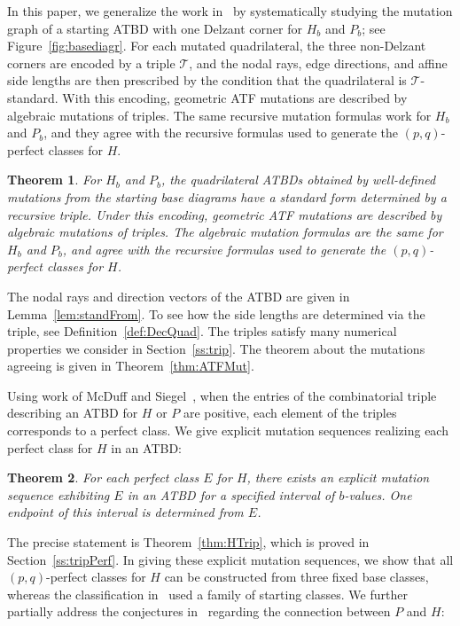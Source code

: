 \documentclass[11pt, reqno]{amsart}
\newtheorem{mainthm}{Theorem}
\theoremstyle{remark}
\numberwithin{equation}{subsection}
\numberwithin{figure}{section}
\theoremstyle{customremark}
\newcommand{\Tt}{\mathcal{T}}
\begin{document}
In this paper, we generalize the work in~\cite{M1} by systematically studying the mutation graph of a starting ATBD with one Delzant corner for \(H_b\) and \(P_b\); see Figure~\ref{fig:basediagr}. For each mutated quadrilateral, the three
non-Delzant corners are encoded by a triple \(\Tt\), and the nodal rays, edge directions, and affine side lengths are then prescribed by the condition that the quadrilateral is \(\Tt\)-standard. With this encoding, geometric ATF mutations are described by algebraic mutations of triples. The same recursive mutation formulas work for \(H_b\) and \(P_b\), and they agree with the recursive formulas used to generate the
\((p,q)\)-perfect classes for \(H\).

 \begin{mainthm}\label{thm:A}
For \(H_b\) and \(P_b\), the quadrilateral ATBDs obtained by well-defined mutations from the starting base diagrams have a standard form determined by a recursive triple. Under this encoding, geometric ATF mutations are described by algebraic mutations of triples. The algebraic mutation formulas are the same for \(H_b\) and \(P_b\), and agree with the recursive formulas used to generate the \((p,q)\)-perfect classes for \(H\).
\end{mainthm}


The nodal rays and direction vectors of the ATBD are given in Lemma~\ref{lem:standFrom}. To see how the side lengths are determined via the triple, see Definition~\ref{def:DecQuad}. The triples satisfy many numerical properties we consider in Section~\ref{ss:trip}. The theorem about the mutations agreeing is given in Theorem~\ref{thm:ATFMut}. 



 Using work of McDuff and Siegel~\cite{McSi}, when the entries of the combinatorial triple describing an ATBD for $H$ or $P$ are positive, each element of the triples corresponds to a perfect class. We give explicit mutation sequences realizing each perfect class for $H$ in an ATBD:
 
\begin{mainthm} \label{thm:B}
For each perfect class $E$ for $H$, there exists an explicit mutation sequence exhibiting $E$ in an ATBD for a specified interval of $b$-values. One endpoint of this interval is determined from $E$.
\end{mainthm}

The precise statement is Theorem~\ref{thm:HTrip}, which is proved in Section~\ref{ss:tripPerf}. In giving these explicit mutation sequences, we show that all $(p,q)$-perfect classes for $H$ can be constructed from three fixed base classes, whereas the classification in~\cite{MMW} used a family of starting classes. We further partially address the
conjectures in~\cite{MPW, MMW, REU} regarding the connection between $P$ and $H$:
 
\end{document}
